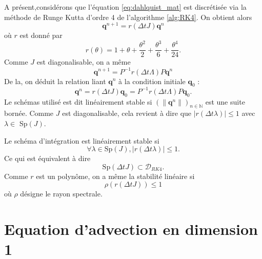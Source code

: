 A présent,considérons que l'équation \eqref{eq:dahlquist_mat} est discrétisée via la méthode de Runge Kutta d'ordre 4 de l'algorithme \ref{alg:RK4}. On obtient alors 
\begin{equation}
\mathbf{q}^{n+1} = r(\Delta t J) \mathbf{q}^n
\end{equation}
où $r$ est donné par 
\begin{equation}
r(\theta) = 1 + \theta + \dfrac{\theta^2}{2} + \dfrac{\theta^3}{6} + \dfrac{\theta^4}{24}.
\end{equation}
Comme $J$ est diagonalisable, on a même
\begin{equation}
\mathbf{q}^{n+1} = P^{-1}r(\Delta t \Lambda)P \mathbf{q}^n
\end{equation}
De la, on déduit la relation liant $\mathbf{q}^n$ à la condition initiale $\mathbf{q}_0$ : 
\begin{equation}
\mathbf{q}^n = r(\Delta t J) \mathbf{q}_0 = P^{-1}r(\Delta t \Lambda)P \mathbf{q}_0.
\end{equation}
Le schémas utilisé est dit linéairement stable si $\left( \| \mathbf{q}^n \| \right)_{n \in \mathbb{N}}$ est une suite bornée. Comme $J$ est diagonalisable, cela revient à dire que $| r(\Delta t \lambda) | \leq 1$ avec $\lambda \in $ Sp$(J)$.

\begin{proposition}
Le schéma d'intégration est linéairement stable si
\begin{equation}
\forall \lambda \in \text{Sp}(J), |r(\Delta t \lambda)| \leq 1.
\end{equation}
Ce qui est équivalent à dire
\begin{equation}
\text{Sp}(\Delta t J) \subset \mathcal{D}_{RK4}.
\end{equation}
Comme $r$ est un polynôme, on a même la stabilité linéaire si
\begin{equation}
\rho(r(\Delta t J)) \leq 1
\end{equation}
où $\rho$ désigne le rayon spectrale.
\end{proposition}










\section{Equation d'advection en dimension 1}

